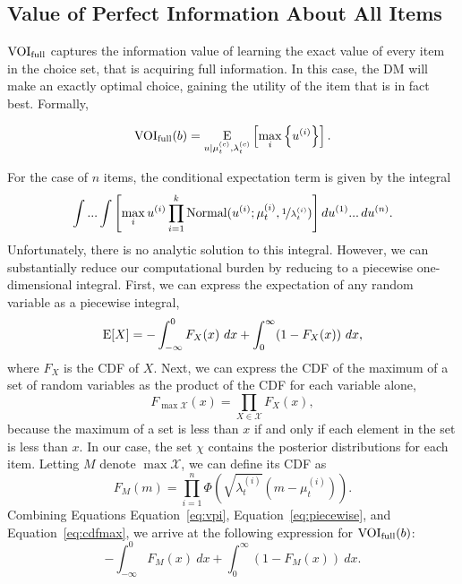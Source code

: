 \subsection{Value of Perfect Information About All Items}
$\text{VOI}_\text{full}$ captures the information value of learning the exact value of every item in the choice set, that is acquiring full information. In this case, the DM will make an exactly optimal choice, gaining the utility of the item that is in fact best. Formally,

\begin{equation}
  \label{eq:vpi}
  \text{VOI}_\text{full}(b)=\operatorname*{E}_{u \mid \mu_{t}^{(c)}, \lambda_{t}^{(c)}} \left[
    \max_{i}\left\{ u^{(i)}\right\}
  \right].
\end{equation}
%

For the case of $n$ items, the conditional expectation term is given by the integral
%
\begin{equation}
  \int...\int\left[\max_{i}u^{(i)}\prod_{i=1}^{k}\mathrm{Normal}(u^{(i)};\mu_t^{(i)},\nicefrac{1}{\lambda_t^{(i)}})\right]du^{(1)}...\,du^{(n)}.
\end{equation}
%
Unfortunately, there is no analytic solution to this integral. However, we can substantially reduce our computational burden by reducing to a piecewise one-dimensional integral. First, we can express the expectation of any random variable as a piecewise integral,
%
\begin{equation}
  \label{eq:piecewise}
  \E[X]=-\int_{-\infty}^{0}F_{X}(x)\ dx+\int_{0}^{\infty}(1-F_{X}(x))\ dx,
\end{equation}
%
where $F_{X}$ is the CDF of $X$. Next, we can express the CDF of the maximum of a set of random variables as the product of the CDF for each variable alone,
%
\begin{equation}
  \label{eq:cdfmax}
  F_{\max\mathcal{X}}(x)=\prod_{X\in\mathcal{X}}F_{X}(x),
\end{equation}
%
because the maximum of a set is less than $x$ if and only if each element in the set is less than $x$. In our case, the set $\chi$ contains the posterior distributions for each item.
Letting $M$ denote $\max \mathcal{X}$, we can define its CDF as
%
\begin{equation}
  F_{M}(m)=\prod_{i=1}^{n}\Phi\left(\sqrt{\lambda_t^{(i)}}\left(m-\mu_t^{(i)}\right)\right).
\end{equation}
%
Combining Equations Equation~\ref{eq:vpi}, Equation~\ref{eq:piecewise}, and Equation~\ref{eq:cdfmax}, we arrive at the following expression for $\text{VOI}_\text{full}(b)$:
%
\begin{equation}
  -\int_{-\infty}^{0}F_{M}(x)\ dx 
  + \int_{0}^{\infty}(1-F_{M}(x))\ dx.
\end{equation}

